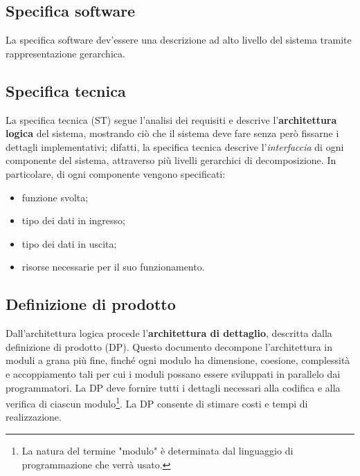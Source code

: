 \documentclass[a4paper]{article}
\begin{document}


		
	\subsection{Specifica software}

		
La specifica software dev'essere una descrizione ad alto livello del sistema tramite rappresentazione gerarchica.

		
	\subsection{Specifica tecnica}

		
La specifica tecnica (ST) segue l'analisi dei requisiti e descrive l'\textbf{architettura logica} del sistema, mostrando ciò che il sistema deve fare senza però fissarne i dettagli implementativi; difatti, la specifica tecnica descrive l'\emph{interfaccia} di ogni componente del sistema, attraverso più livelli gerarchici di decomposizione. In particolare, di ogni componente vengono specificati:
		
	\begin{itemize}
		
			
	\item funzione svolta;
			
	\item tipo dei dati in ingresso;
			
	\item tipo dei dati in uscita;
			
	\item risorse necessarie per il suo funzionamento.
		
	\end{itemize}


		
	\subsection{Definizione di prodotto}

		
Dall'architettura logica procede l'\textbf{architettura di dettaglio}, descritta dalla definizione di prodotto (DP). Questo documento decompone l'architettura in moduli a grana più fine, finché ogni modulo ha dimensione, coesione, complessità e accoppiamento tali per cui i moduli possano essere sviluppati in parallelo dai programmatori. La DP deve fornire tutti i dettagli necessari alla codifica e alla verifica di ciascun modulo\footnote{La natura del termine "modulo" è determinata dal linguaggio di programmazione che verrà usato.}. La DP consente di stimare costi e tempi di realizzazione.
\end{document}
